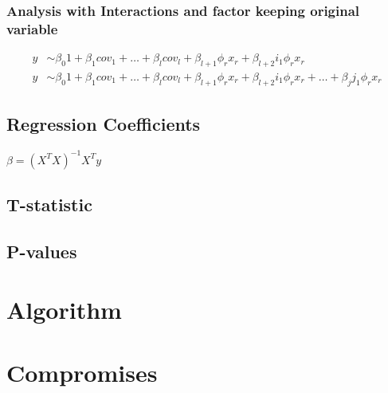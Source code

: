 \subsubsection{Analysis with Interactions and factor keeping original variable}
\begin{align}
y &\sim\beta_0 1 + \beta_1 cov_1 + \dots + \beta_l cov_l +  \beta_{l+1} \phi_{r} x_r +  \beta_{l+2} i_1 \phi_{r} x_r\\
y &\sim \beta_0 1 + \beta_1 cov_1 + \dots + \beta_l cov_l + \beta_{l+1} \phi_{r} x_r + \beta_{l+2} i_1 \phi_{r} x_r + \dots  + \beta_j j_1 \phi_{r} x_r
\end{align}


\subsection{Regression Coefficients}

$\beta=(X^T X)^{-1} X^T y$

\subsection{T-statistic}
\subsection{P-values}


\section{Algorithm}

\section{Compromises}


